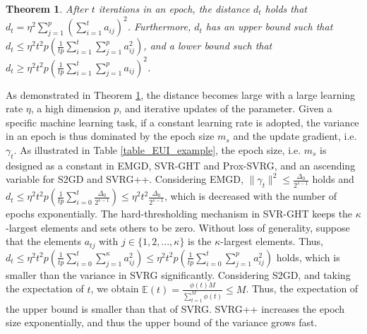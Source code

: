 \documentclass[letterpaper]{article}
\begin{document}
\newtheorem{Theorem}{\bf{Theorem}}
\newtheorem{Corollary}{\bf{Corollary}}
\newtheorem{Lemma}{\bf{Lemma}}
\newtheorem{Assumption}{\bf{Assumption}}


\begin{Theorem}
\label{theorem_vr_lower_bound}
   After $t$ iterations in an epoch, the distance $d_t$ holds that $d_t \mathrm{=} \eta^2 \sum\limits_{j=1}^p\left(  \sum\limits_{i=1}^t a_{ij}  \right)^2$. Furthermore, $d_t$ has an upper bound such that 
   $d_t \mathrm{\le} \eta^2 t^2p  \left( \frac{1}{tp}\sum\limits_{i=1}^t   \sum\limits_{j=1}^p   a_{ij}^2 \right)$, and a lower bound such that $d_t  \mathrm{\ge} \eta^2t^2p \left(\frac{1}{tp}\sum\limits_{i=1}^t   \sum\limits_{j=1}^p   a_{ij}\right)^2$.
\end{Theorem}


As demonstrated in Theorem \ref{theorem_vr_lower_bound}, the distance becomes large with a large learning rate $\eta$, a high dimension $p$, and iterative updates of the parameter. Given a specific machine learning task, if a constant learning rate is adopted, the variance in an epoch is thus dominated by  the epoch size $m_s$ and the update gradient, i.e.  $\gamma_t$.  As illustrated in Table \ref{table_EUI_example}, the epoch size, i.e. $m_s$ is designed as a constant in EMGD, SVR-GHT and Prox-SVRG, and  an ascending variable for  S2GD and SVRG++. Considering EMGD,  $\parallel \gamma_t \parallel^2 \le \frac{\Delta_0}{2^{s-1}}$ holds and $d_t\le \eta^2 t^2 p \left( \frac{1}{tp}\sum\limits_{i=0}^t   \frac{\Delta_0}{2^{s-1}} \right)\le \eta^2t^2 \frac{\Delta_0}{2^{s-1}}$, which is decreased with the number of epochs exponentially. The hard-thresholding mechanism in SVR-GHT keeps the $\kappa$-largest elements and sets others to be zero. Without loss of generality, suppose that the elements $a_{tj}$ with $j\in\{1,2, ..., \kappa\}$ is the $\kappa$-largest elements. Thus, $d_t \le \eta^2 t^2p  \left( \frac{1}{tp}\sum\limits_{i=0}^t   \sum\limits_{j=1}^{\kappa}   a_{ij}^2 \right) \le \eta^2 t^2p  \left( \frac{1}{tp}\sum\limits_{i=0}^t   \sum\limits_{j=1}^p   a_{ij}^2 \right)$ holds, which is smaller than the variance in SVRG significantly. Considering S2GD, and taking the expectation of $t$, we obtain $\mathbb{E}(t)=\frac{\phi(t)M}{\sum_{t=1}^M \phi(t)} \le M$. Thus, the expectation of the upper bound is smaller than that of SVRG. SVRG++ increases the epoch size exponentially, and thus the upper bound of  the variance grows fast.  
\end{document}
